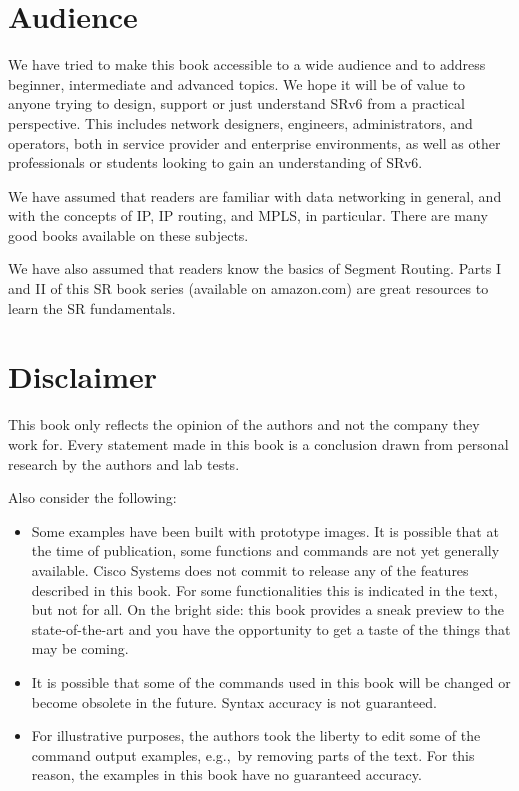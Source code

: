\section*{Audience}

We have tried to make this book accessible to a wide audience and to address beginner, intermediate and advanced topics. We hope it will be of value to anyone trying to design, support or just understand SRv6 from a practical perspective. This includes network designers, engineers, administrators, and operators, both in service provider and enterprise environments, as well as other professionals or students looking to gain an understanding of SRv6.

We have assumed that readers are familiar with data networking in general, and with the concepts of IP, IP routing, and MPLS, in particular. There are many good books available on these subjects.

We have also assumed that readers know the basics of Segment Routing. Parts I and II of this SR book series (available on amazon.com) are great resources to learn the SR fundamentals.

\section*{Disclaimer}

This book only reflects the opinion of the authors and not the company they work for. Every statement made in this book is a conclusion drawn from personal research by the authors and lab tests.


Also consider the following:

\begin{itemize}
\item
  Some examples have been built with prototype images. It is possible that at the time of publication, some functions and commands are not yet generally available. Cisco Systems does not commit to release any of the features described in this book. For some functionalities this is indicated in the text, but not for all. On the bright side: this book provides a sneak preview to the state-of-the-art and you have the opportunity to get a taste of the things that may be coming.
\item
  It is possible that some of the commands used in this book will be changed or become obsolete in the future. Syntax accuracy is not guaranteed.
\item
  For illustrative purposes, the authors took the liberty to edit some of the command output examples, e.g.,~by removing parts of the text. For this reason, the examples in this book have no guaranteed accuracy.
\end{itemize}

